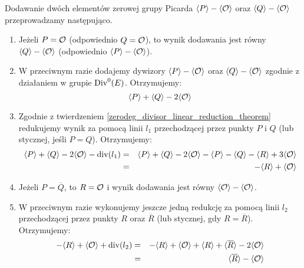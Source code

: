 \begin{fact}\label{piczero_addition_fact}
Dodawanie dwóch elementów zerowej grupy Picarda
$\langle P\rangle - \langle\mathcal{O}\rangle$ oraz $\langle Q\rangle - \langle\mathcal{O}\rangle$
przeprowadzamy następująco.
\begin{enumerate}
\item
Jeżeli $P = \mathcal{O}$ (odpowiednio $Q = \mathcal{O}$),
to wynik dodawania jest równy
$\langle Q\rangle - \langle\mathcal{O}\rangle$ (odpowiednio $\langle P\rangle - \langle\mathcal{O}\rangle$).
\item
W przeciwnym razie dodajemy dywizory
$\langle P\rangle - \langle\mathcal{O}\rangle$ oraz $\langle Q\rangle - \langle\mathcal{O}\rangle$
zgodnie z działaniem w grupie $\operatorname{Div}^0(E)$.
Otrzymujemy:
\begin{equation*}
\langle P\rangle + \langle Q\rangle - 2\langle\mathcal{O}\rangle
\end{equation*}
\item
Zgodnie z twierdzeniem \ref{zerodeg_divisor_linear_reduction_theorem}
redukujemy wynik za pomocą linii $l_1$ przechodzącej przez punkty $P$ i $Q$
(lub stycznej, jeśli $P = Q$).
Otrzymujemy:
\begin{eqnarray*}
\langle P\rangle + \langle Q\rangle - 2\langle\mathcal{O}\rangle - \operatorname{div}(l_1)
& = & \langle P\rangle + \langle Q\rangle - 2\langle\mathcal{O}\rangle
- \langle P\rangle - \langle Q\rangle - \langle R\rangle + 3\langle\mathcal{O}\rangle
\\ & = &
-\langle R\rangle + \langle\mathcal{O}\rangle
\end{eqnarray*}
\item
Jeżeli $P = \overline{Q}$,
to $R = \mathcal{O}$
i wynik dodawania jest równy $\langle\mathcal{O}\rangle - \langle\mathcal{O}\rangle$.
\item
W przeciwnym razie wykonujemy jeszcze jedną redukcję za pomocą linii $l_2$
przechodzącej przez punkty $R$ oraz $\overline{R}$
(lub stycznej, gdy $R = \overline{R}$).
Otrzymujemy:
\begin{eqnarray*}
-\langle R\rangle + \langle\mathcal{O}\rangle + \operatorname{div}(l_2)
& = & -\langle R\rangle + \langle\mathcal{O}\rangle
+ \langle R\rangle + \langle\overline{R}\rangle - 2\langle\mathcal{O}\rangle
\\ & = &
\langle\overline{R}\rangle - \langle\mathcal{O}\rangle
\end{eqnarray*}
\end{enumerate}
\end{fact}
